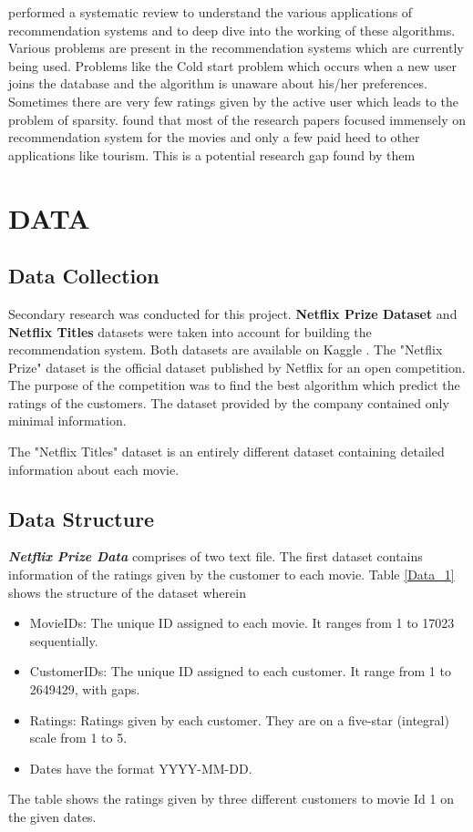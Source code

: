 \documentclass[a4paper,10pt]{article}
\begin{document}
\vspace{3pt}

\cite{roy2022} performed a systematic review to understand the various applications of recommendation systems and to deep dive into the working of these algorithms. Various problems are present in the recommendation systems which are currently being used. Problems like the Cold start problem which occurs when a new user joins the database and the algorithm is unaware about his/her preferences. Sometimes there are very few ratings given by the active user which leads to the problem of sparsity. \cite{roy2022} found that most of the research papers focused immensely on recommendation system for the movies and only a few paid heed to other applications like tourism. This is a potential research gap found by them




\section{DATA}

\subsection{Data Collection}

Secondary research was conducted for this project. \textbf{Netflix Prize Dataset} and \textbf{Netflix Titles} datasets were taken into account for building the recommendation system. Both datasets are available on Kaggle \cite{kaggle}. The "Netflix Prize" dataset is the official dataset published by Netflix for an open competition. The purpose of the competition was to find the best algorithm which predict the ratings of the customers. The dataset provided by the company contained only minimal information. 

The "Netflix Titles" dataset is an entirely different dataset containing detailed information about each movie.

\subsection{Data Structure}

\textbf{\textit{Netflix Prize Data}} comprises of two text file. The first dataset contains information of the ratings given by the customer to each movie. Table \ref{Data_1} shows the structure of the dataset wherein 

\begin{itemize}
  \item MovieIDs: The unique ID assigned to each movie. It ranges from 1 to 17023 sequentially.
  \item CustomerIDs: The unique ID assigned to each customer. It range from 1 to 2649429, with gaps.
  \item Ratings: Ratings given by each customer. They are on a five-star (integral) scale from 1 to 5.
  \item Dates have the format YYYY-MM-DD.
\end{itemize}
The table shows the ratings given by three different customers to movie Id 1 on the given dates. 
\end{document}
